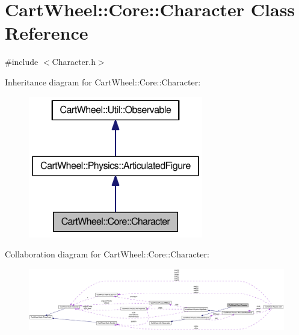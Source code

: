 \hypertarget{classCartWheel_1_1Core_1_1Character}{
\section{CartWheel::Core::Character Class Reference}
\label{classCartWheel_1_1Core_1_1Character}
}


{\ttfamily \#include $<$Character.h$>$}



Inheritance diagram for CartWheel::Core::Character:\nopagebreak
\begin{figure}[H]
\begin{center}
\leavevmode
\includegraphics[width=216pt]{classCartWheel_1_1Core_1_1Character__inherit__graph}
\end{center}
\end{figure}


Collaboration diagram for CartWheel::Core::Character:\nopagebreak
\begin{figure}[H]
\begin{center}
\leavevmode
\includegraphics[width=400pt]{classCartWheel_1_1Core_1_1Character__coll__graph}
\end{center}
\end{figure}

